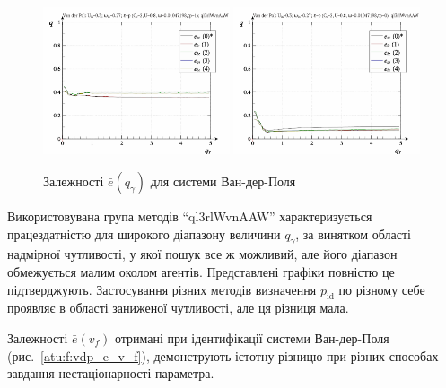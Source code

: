 \begin{figure}[ht!]
\begin{center}
  \includegraphics[width=0.49\textwidth]{p/cha/vdp/vdp_id-p_q_gamma_sign.png}
  \hfill
  \includegraphics[width=0.49\textwidth]{p/cha/vdp/vdp_id-p_q_gamma_sin.png}
\end{center}
  \caption{Залежності $\bar{e}(q_\gamma)$ для системи Ван-дер-Поля}
\label{atu:f:vdp_e_q_gamma}
\end{figure}

Використовувана група методів ``ql3rlWvnAAW'' характеризується
працездатністю для широкого діапазону величини
$ q_\gamma $, за винятком області надмірної чутливості, у
якої пошук все ж можливий, але його діапазон обмежується
малим околом агентів. Представлені графіки повністю це
підтверджують. Застосування різних методів визначення
$p_\mathrm{id} $ по різному себе проявляє в області заниженої
чутливості, але ця різниця мала.


Залежності
$ \bar{e} (v_f) $ отримані при ідентифікації системи Ван-дер-Поля
(рис.~\ref{atu:f:vdp_e_v_f}), демонструють істотну різницю при різних
способах завдання нестаціонарності параметра.

